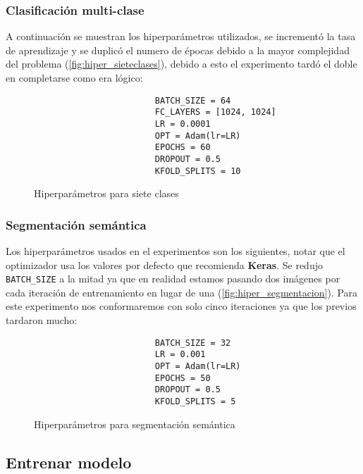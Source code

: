 \subsubsection{Clasificación multi-clase}

A continuación se muestran los hiperparámetros utilizados, se incrementó la tasa
de aprendizaje y se duplicó el numero de épocas debido a la mayor complejidad
del problema  (\autoref{fig:hiper_sieteclases}), debido a esto el experimento
tardó el doble en completarse como era lógico:

\begin{figure}[H]
    \centering
\begin{verbatim}
                        BATCH_SIZE = 64
                        FC_LAYERS = [1024, 1024]
                        LR = 0.0001
                        OPT = Adam(lr=LR)
                        EPOCHS = 60
                        DROPOUT = 0.5
                        KFOLD_SPLITS = 10
\end{verbatim}
\caption{Hiperparámetros para siete clases}\label{fig:hiper_sieteclases}
\end{figure}

\subsubsection{Segmentación semántica}

Los hiperparámetros usados en el experimentos son los siguientes, notar que el
optimizador usa los valores por defecto que recomienda \textbf{Keras}. Se redujo
\texttt{BATCH_SIZE} a la mitad ya que en realidad estamos pasando dos
imágenes por cada iteración de entrenamiento en lugar de una
(\autoref{fig:hiper_segmentacion}). Para este experimento nos conformaremos con
solo cinco iteraciones ya que los previos tardaron mucho:

\begin{figure}[H]
    \centering
\begin{verbatim}
                        BATCH_SIZE = 32
                        LR = 0.001
                        OPT = Adam(lr=LR)
                        EPOCHS = 50
                        DROPOUT = 0.5
                        KFOLD_SPLITS = 5
\end{verbatim}
\caption{Hiperparámetros para segmentación semántica}\label{fig:hiper_segmentacion}
\end{figure}

\subsection{Entrenar modelo}

